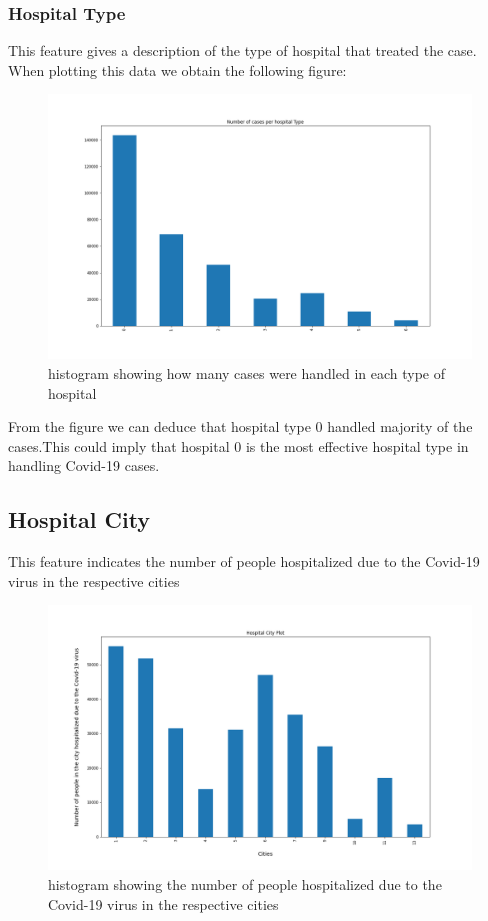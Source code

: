 \documentclass[fleqn]{article}
\begin{document}
		\subsubsection*{Hospital Type}
			This feature gives a description of the type of hospital that treated the case. When plotting this data we obtain the following figure: \\
			\begin{figure}[hb]
  				\includegraphics[width=\linewidth]{hospitalType_hist.png}
  				\caption{histogram showing how many cases were handled in each type of hospital}
  				\label{fig:4}
			\end{figure} 
			\FloatBarrier
			
			From the figure we can deduce that hospital type 0 handled majority of the cases.This could imply that hospital 0 is the most effective hospital type in handling Covid-19 cases.
		\newpage
			
		\subsection*{Hospital City}
		This feature indicates the number of people hospitalized due to the Covid-19 virus in the respective cities
		
		    \begin{figure}[hb]
  				\includegraphics[width=\linewidth]{hospitalCity_hist.png}
  				\caption{histogram showing the number of people hospitalized due to the Covid-19 virus in the respective cities}
  				\label{fig:5}
			\end{figure} 
			\FloatBarrier
			
\end{document}
